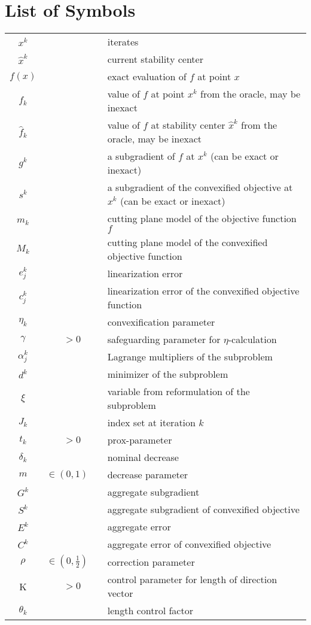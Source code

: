 \section*{List of Symbols}


\begin{tabular}{c@{}c@{} l@{}}
	\(x^k\) && iterates \\
	\(\hat{x}^k\) && current stability center \\
	\(f(x)\) && exact evaluation of \(f\) at point \(x\) \\
	\(f_k\) && value of \(f\) at point \(x^k\) from the oracle, may be inexact \\
	\(\hat{f}_k\) && value of \(f\) at stability center \(\hat{x}^k\) from the oracle, may be inexact \\
	\(g^k\) && a subgradient of \(f\) at \(x^k\) (can be exact or inexact) \\
	\(s^k\) && a subgradient of the convexified objective at \(x^k\) (can be exact or inexact) \\
	\(m_k\) && cutting plane model of the objective function \(f\) \\
	\(M_k\) && cutting plane model of the convexified objective function \\
	\(e_j^k\) && linearization error \\
	\(c_j^k\) && linearization error of the convexified objective function \\
	\(\eta_k\) && convexification parameter \\
	\(\gamma\) & \(>0\) & safeguarding parameter for \(\eta\)-calculation \\
  \(\alpha_j^k\) && Lagrange multipliers of the subproblem \\
	\(d^k\) && minimizer of the subproblem \\
	\(\xi\) && variable from reformulation of the subproblem \\
	\(J_k\) && index set at iteration \(k\) \\
	\(t_k\) &\(>0\)& prox-parameter \\
	\(\delta_k\) && nominal decrease \\
	\(m\) &\(\in (0,1) \quad\)& decrease parameter \\
	\(G^k\) && aggregate subgradient \\
	\(S^k\) && aggregate subgradient of convexified objective \\
	\(E^k\) && aggregate error \\
	\(C^k\)	&& aggregate error of convexified objective \\
	\(\rho\) & \(\in (0,\frac{1}{2}) \quad \) & correction parameter \\
	K & \(>0\) & control parameter for length of direction vector \\ 
	\(\theta_k\) && length control factor
\end{tabular}
